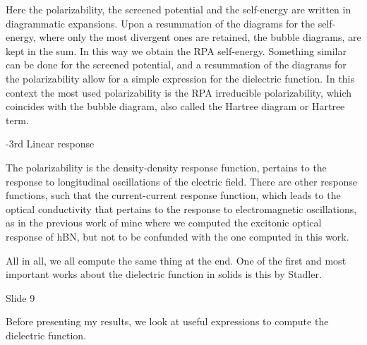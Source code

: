 Here the polarizability, the screened potential and the self-energy are written in 
diagrammatic expansions. Upon a resummation of the diagrams for the self-energy, 
where only the most divergent ones are retained, the bubble diagrams, are kept 
in the sum. In this way we obtain the RPA self-energy. Something similar can be 
done for the screened potential, and a resummation of the diagrams for the 
polarizability allow for a simple expression for the dielectric function.
In this context the most used polarizability is the RPA irreducible polarizability,
which coincides with the bubble diagram, also called the Hartree diagram or Hartree term.

-3rd Linear response

The polarizability is the density-density response function, pertains to the response
to longitudinal oscillations of the electric field. There are other response functions,
such that the current-current response function, which leads to the optical conductivity
that pertains to the response to electromagnetic oscillations, as in the previous work of
mine where we computed the excitonic optical response of hBN, but not to be confunded with
the one computed in this work.

All in all, we all compute the same thing at the end. One of the first and most important
works about the dielectric function in solids is this by Stadler.

Slide 9

Before presenting my results, we look at useful expressions to compute the dielectric function. 
